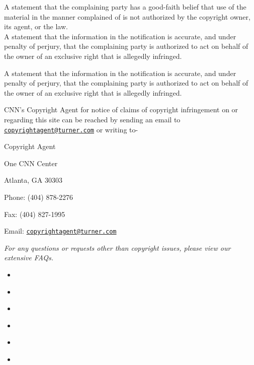 A statement that the complaining party has a good-faith belief that use
of the material in the manner complained of is not authorized by the
copyright owner, its agent, or the law.\\
A statement that the information in the notification is accurate, and
under penalty of perjury, that the complaining party is authorized to
act on behalf of the owner of an exclusive right that is allegedly
infringed.

A statement that the information in the notification is accurate, and
under penalty of perjury, that the complaining party is authorized to
act on behalf of the owner of an exclusive right that is allegedly
infringed.

CNN's Copyright Agent for notice of claims of copyright infringement on
or regarding this site can be reached by sending an email to
\href{mailto:copyrightagent@turner.com}{\nolinkurl{copyrightagent@turner.com}}
or writing to-

Copyright Agent

One CNN Center

Atlanta, GA 30303

Phone: (404) 878-2276

Fax: (404) 827-1995

Email:
\href{mailto:copyrightagent@turner.com}{\nolinkurl{copyrightagent@turner.com}}

\emph{For any questions or requests other than copyright issues, please
view our extensive FAQs.}

\begin{itemize}
\item
\end{itemize}

\begin{itemize}
\item
\end{itemize}

\begin{itemize}
\item
\end{itemize}

\begin{itemize}
\item
\end{itemize}

\begin{itemize}
\item
\end{itemize}

\begin{itemize}
\item
\end{itemize}

